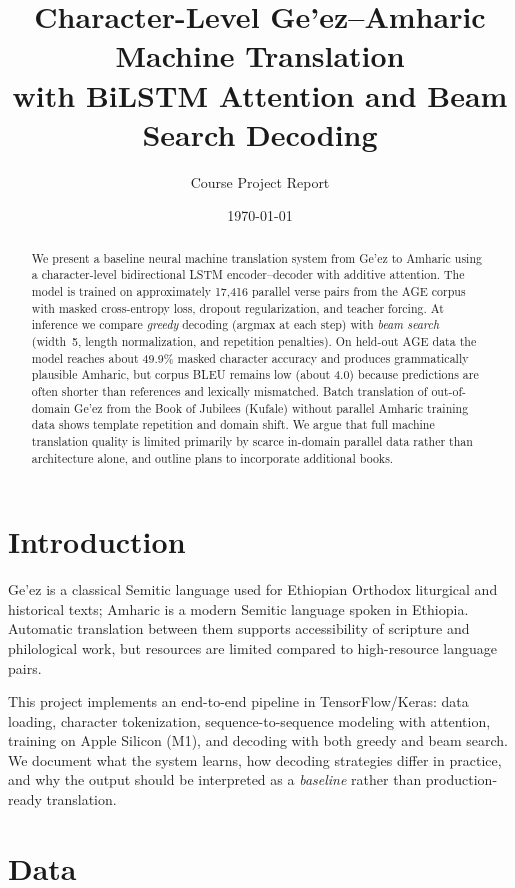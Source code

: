 \documentclass[11pt,a4paper]{article}
\title{Character-Level Ge'ez--Amharic Machine Translation\\with BiLSTM Attention and Beam Search Decoding}
\author{Course Project Report}
\date{\today}
\begin{document}
\maketitle

\begin{abstract}
We present a baseline neural machine translation system from Ge'ez to Amharic using a character-level bidirectional LSTM encoder--decoder with additive attention. The model is trained on approximately 17{,}416 parallel verse pairs from the AGE corpus with masked cross-entropy loss, dropout regularization, and teacher forcing. At inference we compare \emph{greedy} decoding (argmax at each step) with \emph{beam search} (width~5, length normalization, and repetition penalties). On held-out AGE data the model reaches about 49.9\% masked character accuracy and produces grammatically plausible Amharic, but corpus BLEU remains low (about 4.0) because predictions are often shorter than references and lexically mismatched. Batch translation of out-of-domain Ge'ez from the Book of Jubilees (Kufale) without parallel Amharic training data shows template repetition and domain shift. We argue that full machine translation quality is limited primarily by scarce in-domain parallel data rather than architecture alone, and outline plans to incorporate additional books.
\end{abstract}

\section{Introduction}
Ge'ez is a classical Semitic language used for Ethiopian Orthodox liturgical and historical texts; Amharic is a modern Semitic language spoken in Ethiopia. Automatic translation between them supports accessibility of scripture and philological work, but resources are limited compared to high-resource language pairs.

This project implements an end-to-end pipeline in TensorFlow/Keras: data loading, character tokenization, sequence-to-sequence modeling with attention, training on Apple Silicon (M1), and decoding with both greedy and beam search. We document what the system learns, how decoding strategies differ in practice, and why the output should be interpreted as a \emph{baseline} rather than production-ready translation.

\section{Data}
\end{document}
